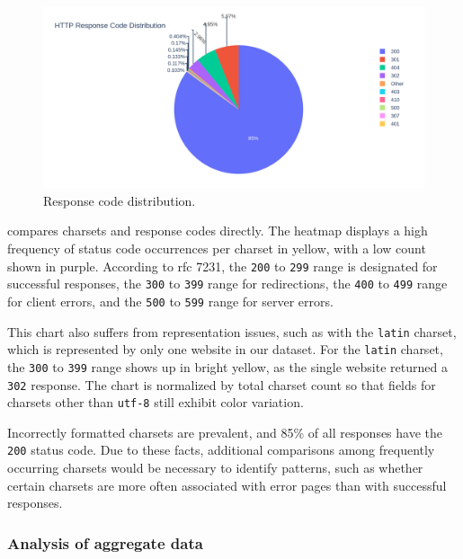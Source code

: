 \begin{figure}[H]
    \centering
    \includegraphics[width=\textwidth]{figures/charts/large/appendix/chart_source_response_code_pie.png}
    \caption{Response code distribution.}
    \label{fig:analysis-dataset-chart_source_response_code_pie}
\end{figure}

 compares charsets and response codes directly.
The heatmap displays a high frequency of status code occurrences per charset in yellow, with a low count shown in purple.
According to \ac{rfc} 7231, the \texttt{200} to \texttt{299} range is designated for successful responses, the \texttt{300} to \texttt{399} range for redirections, the \texttt{400} to \texttt{499} range for client errors, and the \texttt{500} to \texttt{599} range for server errors.

This chart also suffers from representation issues, such as with the \texttt{latin} charset, which is represented by only one website in our dataset.
For the \texttt{latin} charset, the \texttt{300} to \texttt{399} range shows up in bright yellow, as the single website returned a \texttt{302} response.
The chart is normalized by total charset count so that fields for charsets other than \texttt{utf-8} still exhibit color variation.

Incorrectly formatted charsets are prevalent, and 85\% of all responses have the \texttt{200} status code.
Due to these facts, additional comparisons among frequently occurring charsets would be necessary to identify patterns, such as whether certain charsets are more often associated with error pages than with successful responses.


\subsubsection{Analysis of aggregate data}
\label{sec:analysis-dataset-aggregate}

